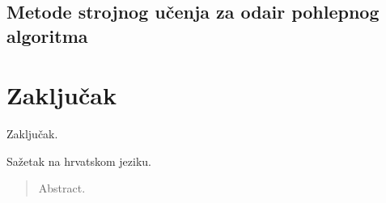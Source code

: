 \documentclass[times, utf8, diplomski, numeric]{fer}
\begin{document}
\section{Metode strojnog učenja za odair pohlepnog algoritma}

\chapter{Zaključak}
Zaključak.




\begin{sazetak}
Sažetak na hrvatskom jeziku.

\end{sazetak}

\begin{abstract}
Abstract.

\end{abstract}
\end{document}
